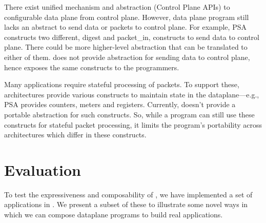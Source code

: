 \documentclass[letterpaper,twocolumn,10pt]{article}
\begin{document}
There exist unified mechanism and abstraction (Control Plane APIs) to configurable data plane from control plane.
However, data plane program still lacks an abstract to send data or packets to control plane.
For example, PSA constructs two different, digest and packet\_in, constructs to send data to control plane.
There could be more higher-level abstraction that can be translated to either of them.
\uarch does not provide abstraction for sending data to control plane, hence exposes the same constructs to the programmers.

Many applications require stateful processing of packets. To support
these, architectures provide various constructs to maintain state in
the dataplane---e.g., PSA provides counters, meters and registers.
Currently, \uarch doesn't provide a portable abstraction for such
constructs. So, while a \ulang program can still use these constructs
for stateful packet processing, it limits the program's portability
across architectures which differ in these constructs.






\section{Evaluation}
\label{sec:evaluation}
To test the expressiveness and composability of \ulang, we have
implemented a set of applications in \ulang. We present a subset of
these to illustrate some novel ways in which  we can compose dataplane
programs to build real applications.
\end{document}
